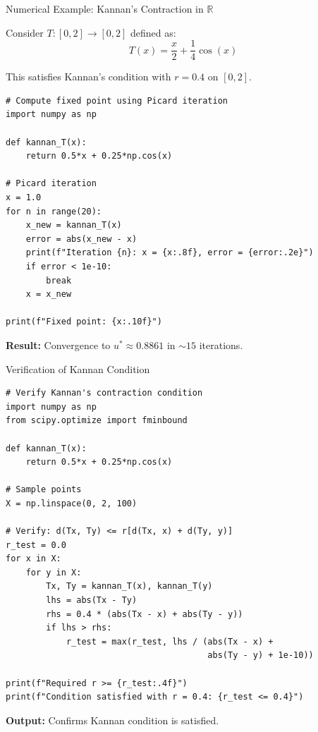 \documentclass[aspectratio=169,10pt]{beamer}
\begin{document}
\begin{frame}[fragile]{Numerical Example: Kannan's Contraction in $\mathbb{R}$}
    \begin{example}[Implementation]
        Consider $T: [0, 2] \to [0, 2]$ defined as:
        \[
            T(x) = \frac{x}{2} + \frac{1}{4}\cos(x)
        \]

        This satisfies Kannan's condition with $r = 0.4$ on $[0, 2]$.
    \end{example}

    \vspace{0.2cm}
    \begin{lstlisting}
# Compute fixed point using Picard iteration
import numpy as np

def kannan_T(x):
    return 0.5*x + 0.25*np.cos(x)

# Picard iteration
x = 1.0
for n in range(20):
    x_new = kannan_T(x)
    error = abs(x_new - x)
    print(f"Iteration {n}: x = {x:.8f}, error = {error:.2e}")
    if error < 1e-10:
        break
    x = x_new

print(f"Fixed point: {x:.10f}")
    \end{lstlisting}

    \vspace{0.2cm}
    \textbf{Result:} Convergence to $u^* \approx 0.8861$ in $\sim 15$ iterations.
\end{frame}

\begin{frame}[fragile]{Verification of Kannan Condition}
    \begin{lstlisting}
# Verify Kannan's contraction condition
import numpy as np
from scipy.optimize import fminbound

def kannan_T(x):
    return 0.5*x + 0.25*np.cos(x)

# Sample points
X = np.linspace(0, 2, 100)

# Verify: d(Tx, Ty) <= r[d(Tx, x) + d(Ty, y)]
r_test = 0.0
for x in X:
    for y in X:
        Tx, Ty = kannan_T(x), kannan_T(y)
        lhs = abs(Tx - Ty)
        rhs = 0.4 * (abs(Tx - x) + abs(Ty - y))
        if lhs > rhs:
            r_test = max(r_test, lhs / (abs(Tx - x) +
                                        abs(Ty - y) + 1e-10))

print(f"Required r >= {r_test:.4f}")
print(f"Condition satisfied with r = 0.4: {r_test <= 0.4}")
    \end{lstlisting}

    \vspace{0.2cm}
    \textbf{Output:} Confirms Kannan condition is satisfied.
\end{frame}
\end{document}
